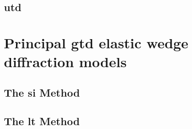 \subsection{\acrfull{utd}}

\section{Principal \acrshort{gtd} elastic wedge diffraction models}
\subsection{The \acrfull{si} Method}
\subsection{The \acrfull{lt} Method}